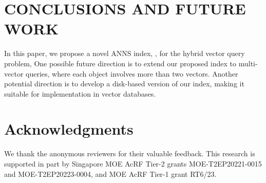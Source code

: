 \section{CONCLUSIONS AND FUTURE WORK}
In this paper, we propose a novel ANNS index, \method, for the hybrid vector query problem,  %
One possible future direction is to extend our proposed index to multi-vector queries, where each object involves more than two vectors. Another potential direction is to develop a disk-based version of our index, making it suitable for implementation in vector databases.

\section*{Acknowledgments}
We thank the anonymous reviewers for their valuable feedback. This research is supported in part by Singapore MOE AcRF Tier-2 grants MOE-T2EP20221-0015 and MOE-T2EP20223-0004, and MOE AcRF Tier-1 grant RT6/23.